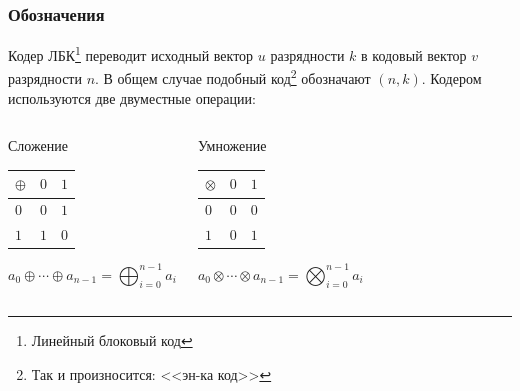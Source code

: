 \begin{frame}
    \frametitle{Обозначения}
    Кодер ЛБК\footnote{Линейный блоковый код} переводит исходный вектор $u$ разрядности $k$ в кодовый вектор $v$ разрядности $n$. В общем случае подобный код\footnote{Так и произносится: <<эн-ка код>>} обозначают $(n, k)$. Кодером используются две двуместные операции:
    \begin{columns}
        \begin{block}{Сложение}
            \begin{table}[ht]
                \label{t:lbcAdd}
                \centering
                \begin{tabular}[c]{l|l|l|}
                    $\oplus$    &$0$  &$1$ \\
                    \hline
                    $0$         &$0$  &$1$ \\
                    \hline
                    $1$         &$1$  &$0$ \\
                    \hline
                \end{tabular}
            \end{table}
            \[a_0\oplus\cdots\oplus a_{n-1}=\bigoplus_{i=0}^{n-1}a_i\]
        \end{block}
        
        \begin{block}{Умножение}
            \begin{table}[ht]
                \label{t:lbcMul}
                \centering
                \begin{tabular}[c]{l|l|l|}
                    $\otimes$   &$0$  &$1$ \\
                    \hline
                    $0$         &$0$  &$0$ \\
                    \hline
                    $1$         &$0$  &$1$ \\
                    \hline
                \end{tabular}
            \end{table}
            \[a_0\otimes\cdots\otimes a_{n-1}=\bigotimes_{i=0}^{n-1}a_i\]
        \end{block}
        
    \end{columns}
\end{frame}


